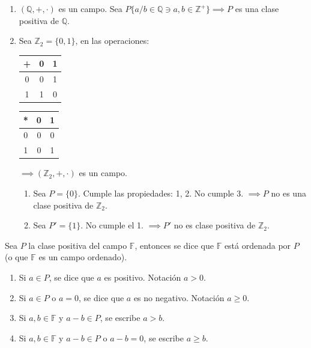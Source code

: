 \begin{ejemplo}
	\begin{enumerate}
		\item $(\mathbb{Q},+,\cdot)$ es un campo. Sea $P\{a/b\in \mathbb{Q}\ni a,b\in\mathbb{Z}^+\}\implies P$ es una clase positiva de $\mathbb{Q}$. 
		\item Sea $\mathbb{Z}_2=\{0,1\}$, en las operaciones: 

	\begin{table}[h]
		\centering
		\begin{tabular}{@{}|c|c|c|@{}}
			\toprule
			+ & 0                        & 1                        \\ \midrule
			0                         & {\color[HTML]{FE0000} 0} & {\color[HTML]{FE0000} 1} \\ \midrule
			1                         & {\color[HTML]{FE0000} 1} & {\color[HTML]{FE0000} 0} \\ \bottomrule
		\end{tabular}
	\end{table}

	\begin{table}[h]
		\centering
		\begin{tabular}{@{}|c|c|c|@{}}
			\toprule
			* & 0                        & 1                        \\ \midrule
			0                         & {\color[HTML]{FE0000} 0} & {\color[HTML]{FE0000} 0} \\ \midrule
			1                         & {\color[HTML]{FE0000} 0} & {\color[HTML]{FE0000} 1} \\ \bottomrule
		\end{tabular}
	\end{table}	
$\implies(\mathbb{Z}_2,+,\cdot)$ es un campo. 
\begin{enumerate}
	\item Sea $P=\{0\}$. Cumple las propiedades: 1, 2. No cumple 3. $\implies P$ no es una clase positiva de $\mathbb{Z}_2$.
	\item Sea $P'=\{1\}$. No cumple el 1. $\implies P'$ no es clase positiva de $\mathbb{Z}_2$.   
\end{enumerate}
	\end{enumerate}
\end{ejemplo}

\begin{definicion}
	Sea $P$ la clase positiva del campo $\mathbb{F}$, entonces se dice que $\mathbb{F}$ está ordenada por $P$ (o que $\mathbb{F}$ es un campo ordenado).
	\begin{enumerate}
		\item Si $a\in P$, se dice que $a$ es positivo. Notación $a>0$. 
		\item Si $a\in P$ o $a=0$, se dice que $a$ es no negativo. Notación $a\geq 0$. 
		\item Si $a,b\in \mathbb{F}$ y $a-b\in P$, se escribe $a>b$. 
		\item Si $a,b\in\mathbb{F}$ y $a-b\in P$ o $a-b=0$, se escribe $a\geq b$.
	\end{enumerate}
\end{definicion}

